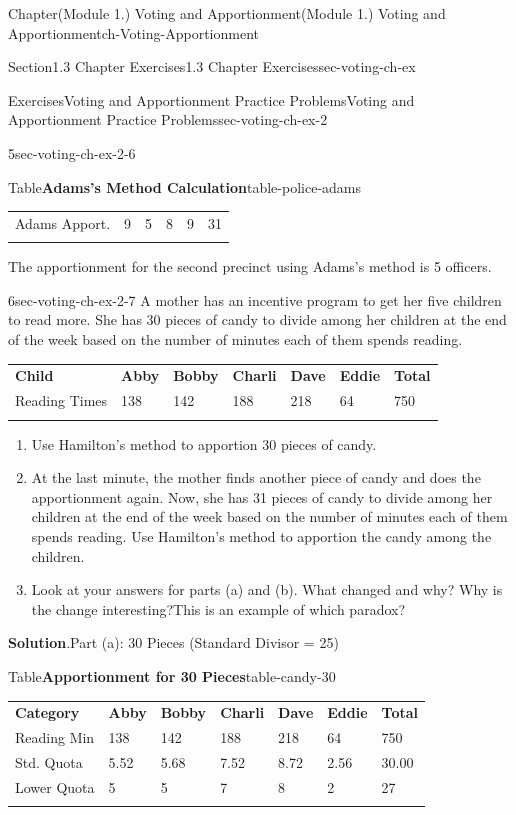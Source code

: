 \documentclass[oneside,10pt,]{book}
\newcommand{\blocktitlefont}{\relax}
\newcommand{\tabularfont}{\relax}
\newcommand{\hrulethin}  {\noalign{\hrule height 0.04em}}
\begin{document}
\begin{chapterptx}{Chapter}{(Module 1.) Voting and Apportionment}{}{(Module 1.) Voting and Apportionment}{}{}{ch-Voting-Apportionment}
\begin{sectionptx}{Section}{1.3 Chapter Exercises}{}{1.3 Chapter Exercises}{}{}{sec-voting-ch-ex}
\begin{exercises-subsection-numberless}{Exercises}{Voting and Apportionment Practice Problems}{}{Voting and Apportionment Practice Problems}{}{}{sec-voting-ch-ex-2}
\begin{divisionexercise}{5}{}{}{sec-voting-ch-ex-2-6}
\begin{tableptx}{Table}{\textbf{Adams's Method Calculation}}{table-police-adams}{}
{\begin{tabular}{llllll}
Adams Apport.&9&5&8&9&31\tabularnewline\hrulethin
\end{tabular}
}%
\end{tableptx}%
The apportionment for the second precinct using Adams's method is 5 officers.%
\end{divisionexercise}%
\begin{divisionexercise}{6}{}{}{sec-voting-ch-ex-2-7}%
A mother has an incentive program to get her five children to read more. She has 30 pieces of candy to divide among her children at the end of the week based on the number of minutes each of them spends reading.%
\begin{center}%
{\tabularfont%
\begin{tabular}{lllllll}\hrulethin
{\bfseries{}Child}&{\bfseries{}Abby}&{\bfseries{}Bobby}&{\bfseries{}Charli}&{\bfseries{}Dave}&{\bfseries{}Eddie}&{\bfseries{}Total}\tabularnewline\hrulethin
Reading Times&138&142&188&218&64&750\tabularnewline\hrulethin
\end{tabular}
}%
\end{center}%
%
\begin{enumerate}[label={(\alph*)}]
\item{}Use Hamilton's method to apportion 30 pieces of candy.%
\item{}At the last minute, the mother finds another piece of candy and does the apportionment again. Now, she has 31 pieces of candy to divide among her children at the end of the week based on the number of minutes each of them spends reading. Use Hamilton's method to apportion the candy among the children.%
\item{}Look at your answers for parts (a) and (b). What changed and why? Why is the change interesting?This is an example of which paradox?%
\end{enumerate}
%
\par\smallskip%
\noindent\textbf{\blocktitlefont Solution}.\hypertarget{sec-voting-ch-ex-2-7-2}{}\quad{}Part (a): 30 Pieces (Standard Divisor = 25)%
\begin{tableptx}{Table}{\textbf{Apportionment for 30 Pieces}}{table-candy-30}{}%
\centering%
{\tabularfont%
\begin{tabular}{lllllll}\hrulethin
{\bfseries{}Category}&{\bfseries{}Abby}&{\bfseries{}Bobby}&{\bfseries{}Charli}&{\bfseries{}Dave}&{\bfseries{}Eddie}&{\bfseries{}Total}\tabularnewline\hrulethin
Reading Min&138&142&188&218&64&750\tabularnewline\hrulethin
Std. Quota&5.52&5.68&7.52&8.72&2.56&30.00\tabularnewline\hrulethin
Lower Quota&5&5&7&8&2&27\tabularnewline\hrulethin

\end{tabular}}
\end{tableptx}
\end{divisionexercise}
\end{exercises-subsection-numberless}
\end{sectionptx}
\end{chapterptx}
\end{document}

